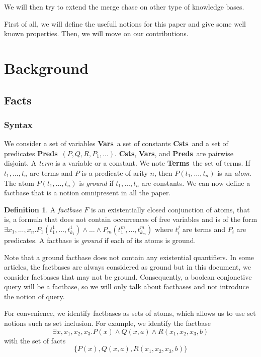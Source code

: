 \documentclass{article}
\theoremstyle{definition}
\newtheorem{definition}{Definition}[section]
\theoremstyle{remark}
\newcommand{\Vars}{\textbf{Vars}}
\newcommand{\Terms}{\textbf{Terms}}
\newcommand{\Preds}{\textbf{Preds}}
\newcommand{\Csts}{\textbf{Csts}}
\begin{document}
We will then try to extend the merge chase on other type of knowledge bases.

\tableofcontents			

First of all, we will define the usefull notions for this paper and give some well known properties. Then, we will move on our contributions. 

\section{Background}


\subsection{Facts}

\subsubsection{Syntax}

We consider a set of variables \Vars\, a set of constants \Csts\, and a set of predicates \Preds\ $(P,Q,R,P_{1},\ldots)$. \Csts, \Vars, and \Preds\ are pairwise disjoint. A \emph{term} is a variable or a constant. We note \Terms\ the set of terms. If $t_1,\ldots,t_n$ are terms and $P$ is a predicate of arity $n$, then $P(t_{1},\ldots,t_{n})$ is an \emph{atom}. The atom $P(t_{1},\ldots,t_{n})$ is \emph{ground} if $t_1,\ldots,t_n$ are constants. We can now define a factbase that is a notion omnipresent in all the paper.  


\begin{definition}
A \emph{factbase} $F$ is an existentially closed conjunction of atoms, that is, a formula that does not contain occurrences of free variables and is of the form $\exists x_{1},\ldots,x_{n}.P_{1}(t_{1}^{1},\ldots,t_{k_{1}}^{1})\land \ldots\land P_{m}(t_{1}^{m},\ldots,t_{k_{m}}^{m})$ where $t_i^j$ are terms and $P_i$ are predicates. A factbase is \emph{ground} if each of its atoms is ground.
\end{definition}

Note that a ground factbase does not contain any  existential quantifiers. In some articles, the factbases are always considered as ground but in this document, we consider factbases that may not be ground. Consequently, a  boolean conjonctive query will be a factbase, so we will only talk about factbases and not introduce the notion of query.

For convenience, we identify factbases as sets of atoms, which allows us to  use  set  notions  such  as  set inclusion. For example, we identify the factbase $$\exists x,x_{1},x_{2},x_{3}. P(x) \land Q(x,a) \land R(x_{1},x_{2},x_{3},b)$$ with the set of facts $$\{P(x),Q(x,a),R(x_{1},x_{2},x_{3},b)\}$$
\end{document}
